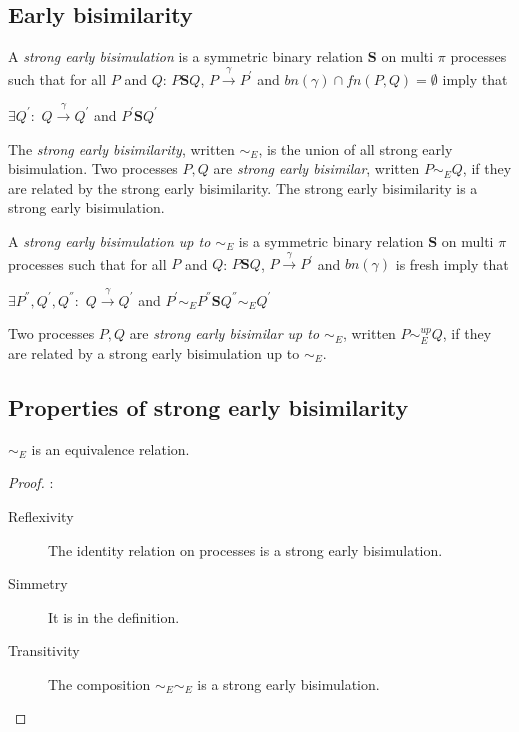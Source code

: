 \subsection{Early bisimilarity}

\begin{definition}\label{strongEarlyBisimulation}
  A \emph{strong early bisimulation} is a symmetric binary relation $\mathbf{S}$ on multi $\pi$ processes such that for all $P$ and $Q$: $P \mathbf{S} Q$, $P \xrightarrow{\gamma} P^{'}$ and $bn(\gamma)\cap fn(P,Q)=\emptyset$ imply that
  \begin{center}
    $\exists Q^{'}:$ $Q \xrightarrow{\gamma} Q^{'}$ and $P^{'}\mathbf{S} Q^{'}$
  \end{center}
  The \emph{strong early bisimilarity}, written $\sim_{E}$, is the union of all strong early bisimulation. Two processes $P,Q$ are \emph{strong early bisimilar}, written $P \sim_{E} Q$, if they are related by the strong early bisimilarity. The strong early bisimilarity is a strong early bisimulation.
\end{definition}

\begin{definition}\label{strongEarlyBisimulationUpTo}
  A \emph{strong early bisimulation up to $\sim_{E}$} is a symmetric binary relation $\mathbf{S}$ on multi $\pi$ processes such that for all $P$ and $Q$: $P \mathbf{S} Q$, $P \xrightarrow{\gamma} P^{'}$ and $bn(\gamma)$ is fresh imply that
  \begin{center}
    $\exists P^{''},Q^{'},Q^{''}:$ $Q \xrightarrow{\gamma} Q^{'}$ and $P^{'} \sim_{E} P^{''} \mathbf{S} Q^{''} \sim_{E} Q^{'} $
  \end{center}
  Two processes $P,Q$ are \emph{strong early bisimilar up to $\sim_{E}$}, written $P \sim_{E}^{up} Q$, if they are related by a strong early bisimulation up to $\sim_{E}$.
\end{definition}

\subsection{Properties of strong early bisimilarity}

\begin{proposition}
  $\sim_{E}$ is an equivalence relation.
  \begin{proof}:
    \begin{description}
      \item[Reflexivity]
	The identity relation on processes is a strong early bisimulation.
      \item[Simmetry]
	It is in the definition.
      \item[Transitivity]
	The composition $\sim_{E} \sim_{E}$ is a strong early bisimulation.
    \end{description}
  \end{proof}
\end{proposition}


